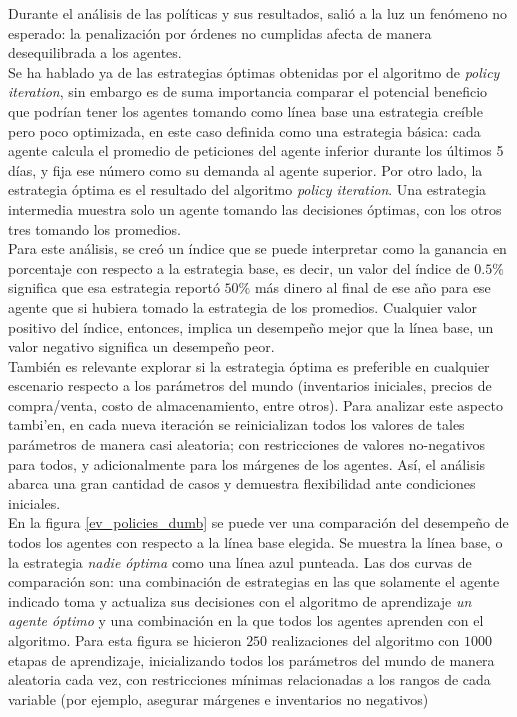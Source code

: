 Durante el an\'alisis de las pol\'iticas y sus resultados, sali\'o a la luz un fen\'omeno no esperado: la penalizaci\'on por \'ordenes no cumplidas afecta de manera desequilibrada a los agentes.\\

Se ha hablado ya de las estrategias \'optimas obtenidas por el algoritmo de \textit{policy iteration}, sin embargo es de suma importancia comparar el potencial beneficio que podr\'ian tener los agentes tomando como l\'inea base una estrategia cre\'ible pero poco optimizada, en este caso definida como una estrategia b\'asica: cada agente calcula el promedio de peticiones del agente inferior durante los \'ultimos 5 d\'ias, y fija ese n\'umero como su demanda al agente superior. Por otro lado, la estrategia \'optima es el resultado del algoritmo \textit{policy iteration}. Una estrategia intermedia muestra solo un agente tomando las decisiones \'optimas, con los otros tres tomando los promedios.\\

Para este an\'alisis, se cre\'o un \'indice que se puede interpretar como la ganancia en porcentaje con respecto a la estrategia base, es decir, un valor del \'indice de $0.5\%$ significa que esa estrategia report\'o $50\%$ m\'as dinero al final de ese a\~no para ese agente que si hubiera tomado la estrategia de los promedios. Cualquier valor positivo del \'indice, entonces, implica un desempe\~no mejor que la l\'inea base, un valor negativo significa un desempe\~no peor.\\

Tambi\'en es relevante explorar si la estrategia \'optima es preferible en cualquier escenario respecto a los par\'ametros del mundo (inventarios iniciales, precios de compra/venta, costo de almacenamiento, entre otros). Para analizar este aspecto tambi'en, en cada nueva iteraci\'on se reinicializan todos los valores de tales par\'ametros de manera casi aleatoria; con restricciones de valores no-negativos para todos, y adicionalmente para los m\'argenes de los agentes. As\'i, el an\'alisis abarca una gran cantidad de casos y demuestra flexibilidad ante condiciones iniciales.\\

En la figura \ref{ev_policies_dumb} se puede ver una comparaci\'on del desempe\~no de todos los agentes con respecto a la l\'inea base elegida. Se muestra la l\'inea base, o la estrategia \textit{nadie \'optima} como una l\'inea azul punteada. Las dos curvas de comparaci\'on son: una combinaci\'on de estrategias en las que solamente el agente indicado toma y actualiza sus decisiones con el algoritmo de aprendizaje \textit{un agente \'optimo} y una combinaci\'on en la que todos los agentes aprenden con el algoritmo. Para esta figura se hicieron $250$ realizaciones del algoritmo con $1000$ etapas de aprendizaje, inicializando todos los par\'ametros del mundo de manera aleatoria cada vez, con restricciones m\'inimas relacionadas a los rangos de cada variable (por ejemplo, asegurar m\'argenes e inventarios no negativos)\\

